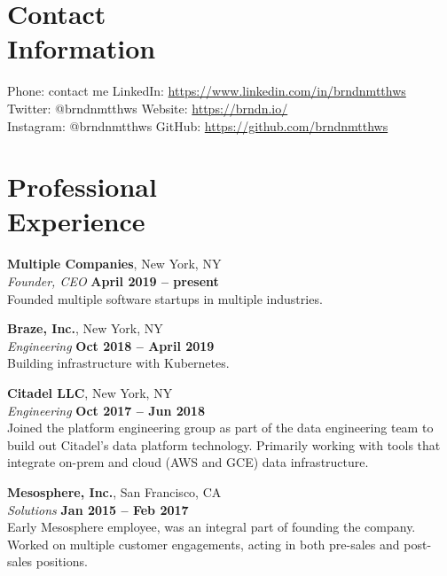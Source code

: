 \documentclass[margin,line]{resume}
\begin{document}
\begin{resume}
    \section{\mysidestyle Contact\\Information}

    Phone: contact me                  \hfill LinkedIn: \url{https://www.linkedin.com/in/brndnmtthws} \\
    \noindent Twitter: @brndnmtthws    \hfill Website: \url{https://brndn.io/} \\
    \noindent Instagram: @brndnmtthws  \hfill GitHub: \url{https://github.com/brndnmtthws}\vspace{0mm}\\\vspace{-4.5mm}

    \section{\mysidestyle Professional\\Experience}

    \textbf{Multiple Companies}, New York, NY \vspace{2mm}\\\vspace{1mm}%
    \textsl{Founder, CEO} \hfill \textbf{April 2019 -- present}\\
    Founded multiple software startups in multiple industries.


    \textbf{Braze, Inc.}, New York, NY \vspace{2mm}\\\vspace{1mm}%
    \textsl{Engineering} \hfill \textbf{Oct 2018 -- April 2019}\\
    Building infrastructure with Kubernetes.

    \textbf{Citadel LLC}, New York, NY \vspace{2mm}\\\vspace{1mm}%
    \textsl{Engineering} \hfill \textbf{Oct 2017 -- Jun 2018}\\
    Joined the platform engineering group as part of the data engineering
    team to build out Citadel's data platform technology. Primarily working
    with tools that integrate on-prem and cloud (AWS and GCE) data
    infrastructure.

    \textbf{Mesosphere, Inc.}, San Francisco, CA \vspace{2mm}\\\vspace{1mm}%
    \textsl{Solutions} \hfill \textbf{Jan 2015 -- Feb 2017}\\
    Early Mesosphere employee, was an integral part of founding the company.
    Worked on multiple customer engagements, acting in both pre-sales and
    post-sales positions.


\end{resume}
\end{document}
